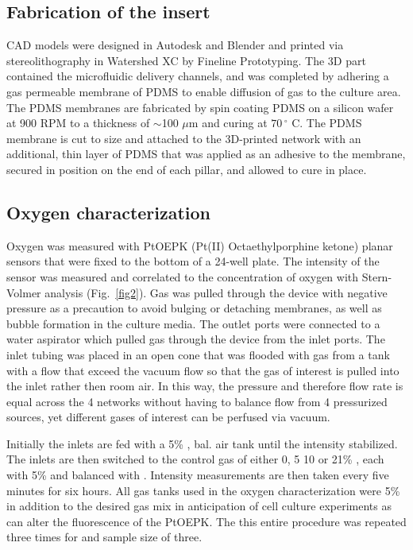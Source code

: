 \documentclass[10pt,letterpaper]{article}
\begin{document}
\subsection*{Fabrication of the insert}

CAD models were designed in Autodesk and Blender and printed via stereolithography in Watershed XC by Fineline Prototyping.
The 3D part contained the microfluidic delivery channels, and was completed by adhering a gas permeable membrane of PDMS to enable diffusion of gas to the culture area. 
The PDMS membranes are fabricated by spin coating PDMS on a silicon wafer at 900 RPM to a thickness of $\sim$100 $\mu$m and curing at $70\,^{\circ}$ C.
The PDMS membrane is cut to size and attached to the 3D-printed network with an additional, thin layer of PDMS that was applied as an adhesive to the membrane, secured in position on the end of each pillar, and allowed to cure in place.

\subsection*{Oxygen characterization}

Oxygen was measured with PtOEPK (Pt(II) Octaethylporphine ketone) planar sensors that were fixed to the bottom of a 24-well plate. 
The intensity of the sensor was measured and correlated to the concentration of oxygen with Stern-Volmer analysis (Fig.~\ref{fig2}).
Gas was pulled through the device with negative pressure as a precaution to avoid bulging or detaching membranes, as well as bubble formation in the culture media.
The outlet ports were connected to a water aspirator which pulled gas through the device from the inlet ports.
The inlet tubing was placed in an open cone that was flooded with gas from a tank with a flow that exceed the vacuum flow so that the gas of interest is pulled into the inlet rather then room air.
In this way, the pressure and therefore flow rate is equal across the 4 networks without having to balance flow from 4 pressurized sources, yet different gases of interest can be perfused via vacuum.

Initially the inlets are fed with a 5\% , bal. air tank until the intensity stabilized.
The inlets are then switched to the control gas of either 0, 5 10 or 21\% , each with 5\%  and balanced with .
Intensity measurements are then taken every five minutes for six hours.
All gas tanks used in the oxygen characterization were 5\%  in addition to the desired gas mix in anticipation of cell culture experiments as  can alter the fluorescence of the PtOEPK.
The this entire procedure was repeated three times for and sample size of three. 
\end{document}
